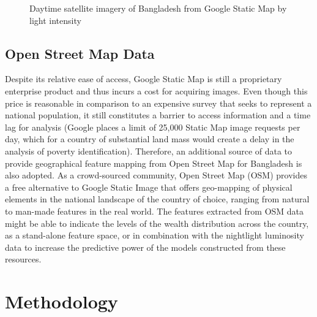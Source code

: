\documentclass[solid,math,chem,code,plot,gloss]{bmc}
\begin{document}
\begin{figure}[hbt!]
  \centering
  \hfill
    \hfill
  \caption{Daytime satellite imagery of Bangladesh from Google Static Map by light intensity}
\end{figure}


\section{Open Street Map Data}

Despite its relative ease of access, Google Static Map is still a proprietary enterprise product and thus incurs a cost for acquiring images. Even though this price is reasonable in comparison to an expensive survey that seeks to represent a national population, it still constitutes a barrier to access information and a time lag for analysis (Google places a limit of 25,000 Static Map image requests per day, which for a country of substantial land mass would create a delay in the analysis of poverty identification). Therefore, an additional source of data to provide geographical feature mapping from Open Street Map for Bangladesh is also adopted. As a crowd-sourced community, Open Street Map (OSM) provides a free alternative to Google Static Image that offers geo-mapping of physical elements in the national landscape of the country of choice, ranging from natural to man-made features in the real world. The features extracted from OSM data might be able to indicate the levels of the wealth distribution across the country, as a stand-alone feature space, or in combination with the nightlight luminosity data to increase the predictive power of the models constructed from these resources.  

\chapter{Methodology}
\end{document}
